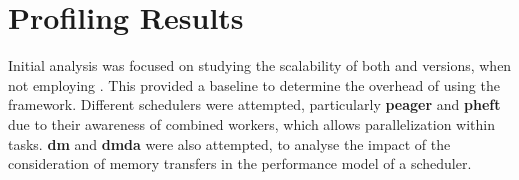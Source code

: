 \documentclass[main.tex]{subfiles}
\begin{document}
\chapter{Profiling Results} \label{chapter:results}


Initial analysis was focused on studying the scalability of both \cpu and \cuda versions, when not employing \starpu. This provided a baseline to determine the overhead of using the framework. Different schedulers were attempted, particularly \textbf{peager} and \textbf{pheft} due to their awareness of combined workers, which allows \openmp parallelization within \cpu tasks. \textbf{dm} and \textbf{dmda} were also attempted, to analyse the impact of the consideration of memory transfers in the performance model of a scheduler.




%


\end{document}
